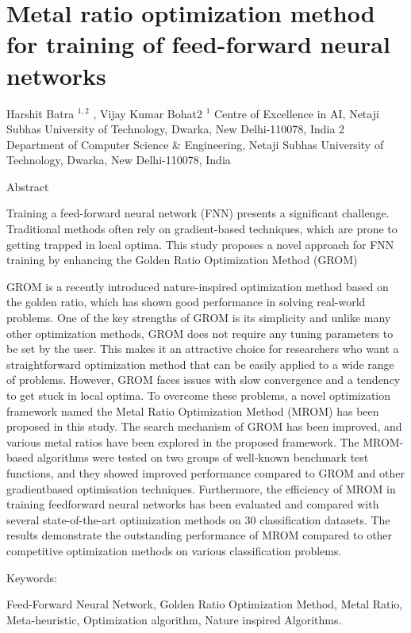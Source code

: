 \section{Metal ratio optimization method for training of feed-forward neural networks}

Harshit Batra $^{1,2}$ , Vijay Kumar Bohat2 $^1$ Centre of Excellence in AI, Netaji Subhas University of Technology, Dwarka, New Delhi-110078, India 2 Department of Computer Science \& Engineering, Netaji Subhas University of Technology, Dwarka, New Delhi-110078, India

Abstract

Training a feed-forward neural network (FNN) presents a significant challenge. Traditional methods often rely on gradient-based techniques, which are prone to getting trapped in local optima. This study proposes a novel approach for FNN training by enhancing the Golden Ratio Optimization Method (GROM)

GROM is a recently introduced nature-inspired optimization method based on the golden ratio, which has shown good performance in solving real-world problems. One of the key strengths of GROM is its simplicity and unlike many other optimization methods, GROM does not require any tuning parameters to be set by the user. This makes it an attractive choice for researchers who want a straightforward optimization method that can be easily applied to a wide range of problems. However, GROM faces issues with slow convergence and a tendency to get stuck in local optima. To overcome these problems, a novel optimization framework named the Metal Ratio Optimization Method (MROM) has been proposed in this study. The search mechanism of GROM has been improved, and various metal ratios have been explored in the proposed framework. The MROM-based algorithms were tested on two groups of well-known benchmark test functions, and they showed improved performance compared to GROM and other gradientbased optimisation techniques. Furthermore, the efficiency of MROM in training feedforward neural networks has been evaluated and compared with several state-of-the-art optimization methods on 30 classification datasets. The results demonstrate the outstanding performance of MROM compared to other competitive optimization methods on various classification problems.

Keywords:

Feed-Forward Neural Network, Golden Ratio Optimization Method, Metal Ratio, Meta-heuristic, Optimization algorithm, Nature inspired Algorithms.

